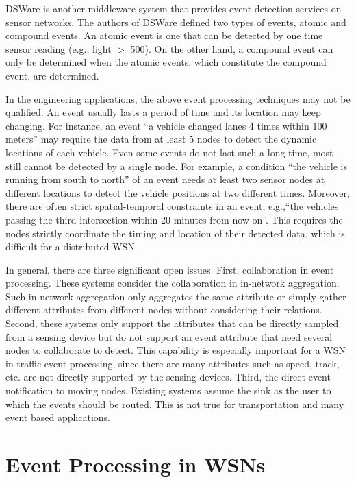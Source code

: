 \documentclass[12pt,journal,draftcls,letterpaper,onecolumn]{elsarticle}
\begin{document}
DSWare \cite{Li03eventdetection} is another middleware system that
provides event detection services on sensor networks. The authors of
DSWare defined two types of events, atomic and compound events. An
atomic event is one that can be detected by one time sensor reading
(e.g., light $>$ 500). On the other hand, a compound event can only
be determined when the atomic events, which constitute the compound
event, are determined.

In the engineering applications, the above event processing
techniques may not be qualified. An event usually lasts a period of
time and its location may keep changing. For instance, an event ``a
vehicle changed lanes 4 times within 100 meters'' may require the
data from at least 5 nodes to detect the dynamic locations of each
vehicle. Even some events do not last such a long time, most still
cannot be detected by a single node. For example, a condition ``the
vehicle is running from south to north'' of an event needs at least
two sensor nodes at different locations to detect the vehicle
positions at two different times. Moreover, there are often strict
spatial-temporal constraints in an event, e.g.,``the vehicles
passing the third intersection within 20 minutes from now on''. This
requires the nodes strictly coordinate the timing and location of
their detected data, which is difficult for a distributed WSN.


In general, there are three significant open issues. First,
collaboration in event processing. These systems consider the
collaboration in in-network aggregation. Such in-network aggregation
only aggregates the same attribute or simply gather different
attributes from different nodes without considering their relations.
Second, these systems only support the attributes that can be
directly sampled from a sensing device but do not support an event
attribute that need several nodes to collaborate to detect. This
capability is especially important for a WSN in traffic event
processing, since there are many attributes such as speed, track,
etc. are not directly supported by the sensing devices. Third, the
direct event notification to moving nodes. Existing systems assume
the sink as the user to which the events should be routed. This is
not true for transportation and many event based applications.


\section{Event Processing in WSNs}
\end{document}
